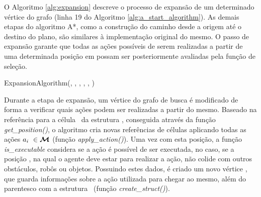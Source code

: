 O Algoritmo \ref{alg:expansion} descreve o processo de expansão de um determinado vértice do grafo  (linha 19 do Algoritmo \ref{alg:a_start_algorithm}).
As demais etapas do algoritmo A*, como a construção do caminho desde a origem até o destino do plano, são similares à implementação original do mesmo.
O passo de expansão garante que todas as ações possíveis de serem realizadas a partir de uma determinada posição em  possam ser posteriormente avaliadas pela função de seleção.

\begin{algorithm}[htpb]
  \caption[ExpansionAlgorithm]{ExpansionAlgorithm(\currentstate, \targetstate, , , , )}
  \label{alg:expansion}
  \begin{algorithmic}[1]


    \FORALL{\movementaction\ $\in$ \movementset}

      \STATE{}
      \STATE{}

        \STATE{$\plangraph \leftarrow \plangraph \cup \{\nextstate\}$}
      \ENDIF

      \STATE{}
      \STATE{$\fringe \leftarrow \fringe \cup \{\nextstate\}$}
    \ENDFOR
  \end{algorithmic}
\end{algorithm}

Durante a etapa de expansão, um vértice do grafo de busca é modificado de forma a verificar quais ações podem ser realizadas a partir do mesmo.
Baseado na referência para a célula \wcell\ da estrutura \currentstate, conseguida através da função \emph{get\_position()}, o algoritmo cria novas referências de células aplicando todas as ações $a_i\ \in \boldsymbol{\mathcal{M}}$ (função \emph{apply\_action()}).
Uma vez com esta posição, a função \emph{is\_executable} considera se a ação é possível de ser executada, no caso, se a posição \robotstate, na qual o agente deve estar para realizar a ação, não colide com outros obstáculos, robôs ou objetos.
Possuindo estes dados, é criado um novo vértice \nextstate, que guarda informações sobre a ação utilizada para chegar ao mesmo, além do parentesco com a estrutura \currentstate\ (função \emph{create\_struct()}).

